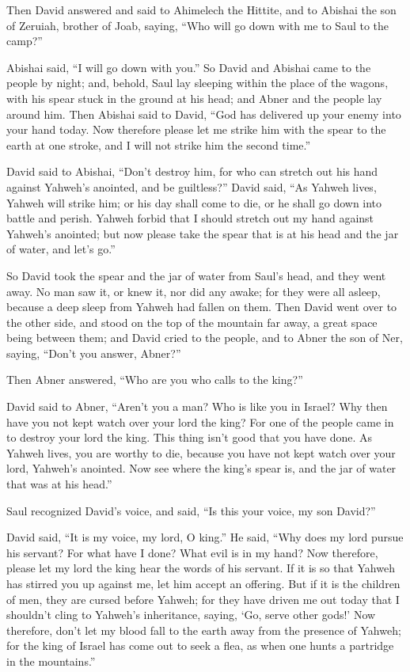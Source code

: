  Then David answered and said to Ahimelech the Hittite,
and to Abishai the son of Zeruiah, brother of Joab, saying, ``Who will
go down with me to Saul to the camp?''

Abishai said, ``I will go down with you.''  So David and
Abishai came to the people by night; and, behold, Saul lay sleeping
within the place of the wagons, with his spear stuck in the ground at
his head; and Abner and the people lay around him.  Then
Abishai said to David, ``God has delivered up your enemy into your hand
today. Now therefore please let me strike him with the spear to the
earth at one stroke, and I will not strike him the second time.''

 David said to Abishai, ``Don't destroy him, for who can
stretch out his hand against Yahweh's anointed, and be guiltless?''
 David said, ``As Yahweh lives, Yahweh will strike him;
or his day shall come to die, or he shall go down into battle and
perish.  Yahweh forbid that I should stretch out my hand
against Yahweh's anointed; but now please take the spear that is at his
head and the jar of water, and let's go.''

 So David took the spear and the jar of water from Saul's
head, and they went away. No man saw it, or knew it, nor did any awake;
for they were all asleep, because a deep sleep from Yahweh had fallen on
them.  Then David went over to the other side, and stood
on the top of the mountain far away, a great space being between them;
 and David cried to the people, and to Abner the son of
Ner, saying, ``Don't you answer, Abner?''

Then Abner answered, ``Who are you who calls to the king?''

 David said to Abner, ``Aren't you a man? Who is like you
in Israel? Why then have you not kept watch over your lord the king? For
one of the people came in to destroy your lord the king. 
This thing isn't good that you have done. As Yahweh lives, you are
worthy to die, because you have not kept watch over your lord, Yahweh's
anointed. Now see where the king's spear is, and the jar of water that
was at his head.''

 Saul recognized David's voice, and said, ``Is this your
voice, my son David?''

David said, ``It is my voice, my lord, O king.''  He
said, ``Why does my lord pursue his servant? For what have I done? What
evil is in my hand?  Now therefore, please let my lord
the king hear the words of his servant. If it is so that Yahweh has
stirred you up against me, let him accept an offering. But if it is the
children of men, they are cursed before Yahweh; for they have driven me
out today that I shouldn't cling to Yahweh's inheritance, saying, `Go,
serve other gods!'  Now therefore, don't let my blood
fall to the earth away from the presence of Yahweh; for the king of
Israel has come out to seek a flea, as when one hunts a partridge in the
mountains.''

